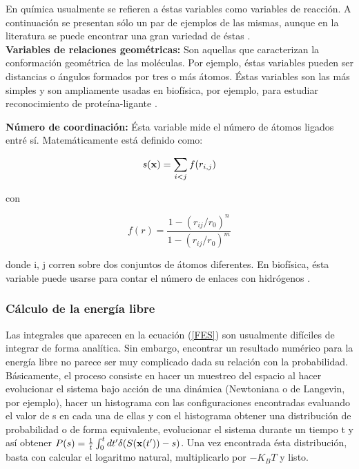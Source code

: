 \documentclass [11pt]{article}
\begin{document}
En química usualmente se refieren a éstas variables como variables de reacción. A continuación se presentan sólo un par de ejemplos de las mismas, aunque en la literatura se puede encontrar una gran variedad de éstas \cite{fiorin}.\\

{\bf Variables de relaciones geométricas:} Son aquellas que caracterizan la conformación geométrica de las moléculas. Por ejemplo, éstas variables pueden ser distancias o ángulos formados por tres o más átomos. Éstas variables son las más simples y son ampliamente usadas en biofísica, por ejemplo, para estudiar reconocimiento de proteína-ligante \cite{masetti}.

{\bf Número de coordinación:} Ésta variable mide el número de átomos ligados entré sí. Matemáticamente está definido como:

\begin{equation}
    s({\bf x})=\sum_{i<j}f(r_{i,j})
\end{equation}

con 

\begin{equation}
    f(r)=\frac{1-(r_{ij}/r_0)^n}{1-(r_{ij}/r_0)^m}
\end{equation}

donde i, j corren sobre dos conjuntos de átomos diferentes. En biofísica, ésta variable puede usarse para contar el número de enlaces con hidrógenos \cite{bussi}.

\subsubsection{Cálculo de la energía libre}

Las integrales que aparecen en la ecuación (\ref{FES}) son usualmente difíciles de integrar de forma analítica. Sin embargo, encontrar un resultado numérico para la energía libre no parece ser muy complicado dada su relación con la probabilidad. Básicamente, el proceso consiste en hacer un muestreo del espacio al hacer evolucionar el sistema bajo acción de una dinámica (Newtoniana o de Langevin, por ejemplo), hacer un histograma con las configuraciones encontradas evaluando el valor de s en cada una de ellas y con el histograma obtener una distribución de probabilidad o de forma equivalente, evolucionar el sistema durante un tiempo t y así obtener $P(s)=\frac{1}{t}\int_0^tdt' \delta(S({\bf x}(t'))-s)$. Una vez encontrada ésta distribución, basta con calcular el logaritmo natural, multiplicarlo por $-K_BT$ y listo.
\end{document}
